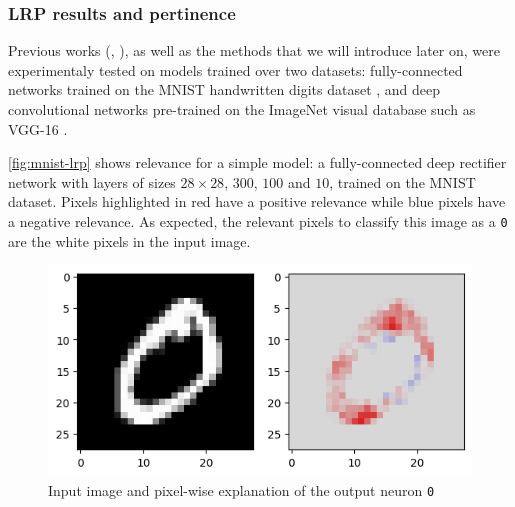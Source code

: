 \documentclass{../cs-classes/cs-classes}
\begin{document}
\subsubsection{LRP results and pertinence}
Previous works (\cite{bach-2015}, \cite{montavon-lrp}), as well as the methods that we will introduce later on, were experimentaly tested on models trained over two datasets: fully-connected networks trained on the MNIST handwritten digits dataset \cite{mnist-dataset}, and deep convolutional networks pre-trained on the ImageNet visual database such as VGG-16 \cite{vgg}.

\autoref{fig:mnist-lrp} shows relevance for a simple model: a fully-connected deep rectifier network with layers of sizes $28\times28$, $300$, $100$ and $10$, trained on the MNIST dataset. Pixels highlighted in red have a positive relevance while blue pixels have a negative relevance. As expected, the relevant pixels to classify this image as a \texttt{0} are the white pixels in the input image.

\begin{figure}[H]
    \centering
    \includegraphics[width=.5\textwidth]{mnist-lrp.png}
    \caption{Input image and pixel-wise explanation of the output neuron \texttt{0}}
    \label{fig:mnist-lrp}
\end{figure}
\end{document}
